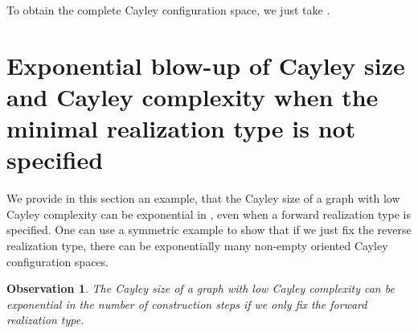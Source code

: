 \documentclass[secthm,amsthm,english]{article}
\newtheorem{observation}{Observation}
\theoremstyle{definition}
\theoremstyle{remark}
\begin{document}
\noindent To obtain the complete Cayley configuration space, we just take .

\section{Exponential blow-up of Cayley size and Cayley complexity when the minimal realization type is not specified}
\label{sec:Exponential}

We provide in this section an example, 
that the Cayley size of a graph with low Cayley complexity can be exponential in , 
even when a forward realization type is specified. 
One can use a symmetric example to show that if we just fix the reverse realization type, there can be exponentially many non-empty oriented Cayley configuration spaces. 

\begin{observation} \label{obs:interval-expo} 
The Cayley size of a graph with low Cayley complexity can be exponential
in the number of construction steps if we only fix the forward realization type.
\end{observation}
\end{document}
